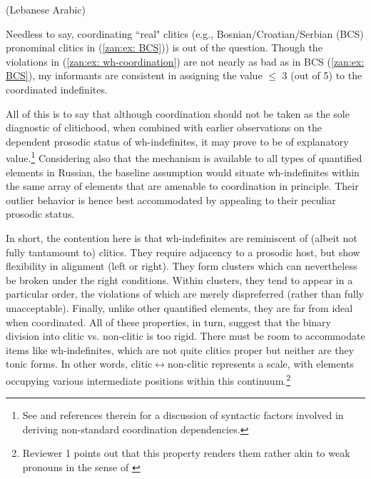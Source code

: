 \documentclass[output=paper,colorlinks,citecolor=brown]{langscibook}
\begin{document}
\z
\hfill {(Lebanese Arabic)}
\z

\noindent Needless to say, coordinating  ``real" clitics (e.g., Bosnian/Croatian/Serbian (BCS) pronominal clitics in (\ref{zan:ex: BCS})) is out of the question. Though the violations in (\ref{zan:ex: wh-coordination}) are not nearly as bad as in BCS (\ref{zan:ex: BCS}), my informants are consistent in assigning the value $\le$ 3 (out of 5) to the coordinated indefinites.  

\z

 \noindent All of this is to say that although coordination should not be taken as the sole diagnostic of clitichood, when combined with earlier observations on the dependent prosodic status of wh-indefinites, it may prove to be of explanatory value.\footnote{See \citet{citko2013puzzles} and references therein for a discussion of syntactic factors involved in deriving non-standard coordination dependencies.} Considering also that the mechanism is available to all types of quantified elements in Russian, the baseline assumption would situate wh-indefinites within the same array of elements that are amenable to coordination in principle. Their outlier behavior is hence best accommodated by appealing to their peculiar prosodic status.

 In short, the contention here is that wh-indefinites are reminiscent of (albeit not fully tantamount to) clitics. They require adjacency to a prosodic host, but show flexibility in alignment (left or right). They form clusters which can nevertheless be broken under the right conditions. Within clusters, they tend to appear in a particular order, the violations of which are merely dispreferred (rather than fully unacceptable). Finally, unlike other quantified elements, they are far from ideal when coordinated. All of these properties, in turn, suggest that the binary division into clitic vs. non-clitic is too rigid. There must be room to accommodate items like wh-indefinites, which are not quite clitics proper but neither are they tonic forms. In other words, clitic$\longleftrightarrow$non-clitic represents a scale, with elements occupying various intermediate positions within this continuum.\footnote{Reviewer 1 points out that this property renders them rather akin to weak pronouns in the sense of \citet{CardinalettiStarke1999}} 
\end{document}
